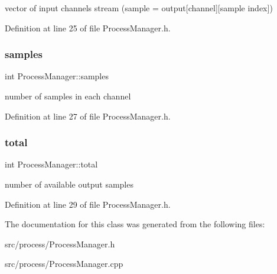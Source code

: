 vector of input channels stream (sample = output\mbox{[}channel\mbox{]}\mbox{[}sample index\mbox{]}) 

Definition at line 25 of file Process\+Manager.\+h.

\mbox{\label{class_process_manager_aac9c5dea3ac0ed72df1f6f780c62010a}} 
\subsubsection{\texorpdfstring{samples}{samples}}
{\footnotesize\ttfamily int Process\+Manager\+::samples}

number of samples in each channel 

Definition at line 27 of file Process\+Manager.\+h.

\mbox{\label{class_process_manager_abcf97b9835a8dfb0d55e37069663cda9}} 
\subsubsection{\texorpdfstring{total}{total}}
{\footnotesize\ttfamily int Process\+Manager\+::total}

number of available output samples 

Definition at line 29 of file Process\+Manager.\+h.



The documentation for this class was generated from the following files\+:\begin{DoxyCompactItemize}
\item 
src/process/Process\+Manager.\+h\item 
src/process/Process\+Manager.\+cpp\end{DoxyCompactItemize}
